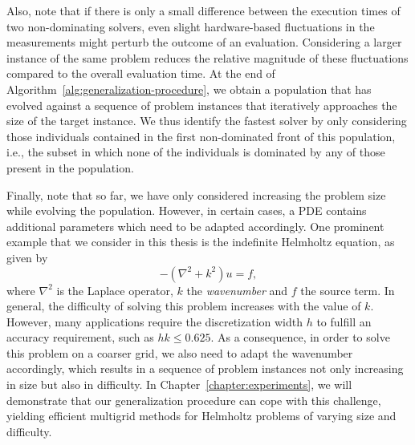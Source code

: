 Also, note that if there is only a small difference between the execution times of two non-dominating solvers, even slight hardware-based fluctuations in the measurements might perturb the outcome of an evaluation.
Considering a larger instance of the same problem reduces the relative magnitude of these fluctuations compared to the overall evaluation time.
At the end of Algorithm~\ref{alg:generalization-procedure}, we obtain a population that has evolved against a sequence of problem instances that iteratively approaches the size of the target instance.
We thus identify the fastest solver by only considering those individuals contained in the first non-dominated front of this population, i.e., the subset in which none of the individuals is dominated by any of those present in the population.

Finally, note that so far, we have only considered increasing the problem size while evolving the population.
However, in certain cases, a PDE contains additional parameters which need to be adapted accordingly.
One prominent example that we consider in this thesis is the indefinite Helmholtz equation, as given by
\begin{equation}
	-(\nabla^{2} + k^{2})u = f,
	\label{eq:helmholtz}
\end{equation}
where $\nabla^{2}$ is the Laplace operator, $k$ the \emph{wavenumber} and $f$ the source term.
In general, the difficulty of solving this problem increases with the value of $k$.
However, many applications require the discretization width $h$ to fulfill an accuracy requirement, such as $h k \leq 0.625$. 
As a consequence, in order to solve this problem on a coarser grid, we also need to adapt the wavenumber accordingly, which results in a sequence of problem instances not only increasing in size but also in difficulty.
In Chapter~\ref{chapter:experiments}, we will demonstrate that our generalization procedure can cope with this challenge, yielding efficient multigrid methods for Helmholtz problems of varying size and difficulty.

